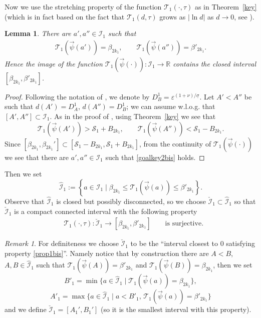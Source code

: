 \documentclass[10pt]{article}
\numberwithin{equation}{section}
\def\ep{\varepsilon}
\def\R{{\mathbb R}}
\def\SS{{\mathcal S}}
\def\TTT{\mathscr{T}}
\newtheorem{lemma}[theorem]{Lemma}
\theoremstyle{definition}
\theoremstyle{remark}
\newtheorem{remark}[theorem]{Remark}
\begin{document}
Now we use the stretching property of the function  $\TTT_1(\cdot, \tau)$  as in Theorem~\ref{key} (which is in fact
based on the fact that $\TTT_1(d, \tau)$ grows as  $|\ln d|$   as $d \to 0$, see \cite{CFPrestate}).

\begin{lemma}\label{key2bismod}
  There are $a',a'' \in   \mathcal{I}_1$ such that
 \begin{equation}\label{goalkey2bis}
   \begin{split}
    \TTT_1(\vec{\psi}(a')) =     \beta_{2k_1},  \qquad  \TTT_1(\vec{\psi}(a'')) =     \beta'_{2k_1}.
   \end{split}
 \end{equation}
 Hence the image of the function $\TTT_1(\vec{\psi}(\cdot)) :  \mathcal{I}_1 \to \R$
 contains the closed interval $[\beta_{2k_1} ,\beta'_{2k_1}]$.
\end{lemma}
\begin{proof}
Following the notation of \cite[Lemma 5.1]{CFPrestate}, we denote by  $D^1_B= \ep^{(1+\nu)/\underline{\sigma}}$. Let   $A'<A''$  be such that
$d(A')=D_A^1$, $d(A'')=D_B^1$; we can assume w.l.o.g. that $[A',A''] \subset \mathcal{I}_1$. As in the proof of \cite[Lemma 5.1]{CFPrestate},
using Theorem~\ref{key} we see that
$$\TTT_1 (\vec{\psi}(A'))> \SS_1+ B_{2k_1}, \qquad  \TTT_1 (\vec{\psi}(A''))< \SS_1- B_{2k_1}.$$
Since
$[\beta_{2k_1},\beta_{2k_1}']\subset[\SS_1-B_{2k_1},\SS_1+B_{2k_1}]$, from the continuity of $\TTT_1 (\vec{\psi}(\cdot))$   we see that there
are $a', a'' \in \mathcal{I}_1$ such that
\eqref{goalkey2bis} holds.
\end{proof}
Then we set
$$
\mathcal{\hat{I}}_1:=  \left\{ a \in \mathcal{I}_1 \mid \beta_{2k_1} \le \TTT_1(\vec{\psi}(a))  \le \beta'_{2k_1}   \right\}.$$
Observe that $\mathcal{\hat{I}}_1$ is closed but possibly disconnected, so we choose $\mathcal{\check{I}}_1\subset \mathcal{\hat{I}}_1$ so
that
$\mathcal{\check{I}}_1$ is a compact connected interval with the following property
 \begin{equation}\label{prop1bis}
     \begin{split}
 &   \TTT_1(\cdot,\tau):  \mathcal{\check{I}}_1  \to  [\beta_{2k_1}, \beta'_{2k_1}] \qquad \textrm{is surjective}.
                                 \end{split}
   \end{equation}



\begin{remark}\label{closest}
  For definiteness  we choose $\mathcal{\check{I}}_1$ to be   the ``interval closest to $0$ satisfying property
   \eqref{prop1bis}''.  Namely notice that by construction there are $A<B$, $A,B \in \mathcal{\hat{I}}_1$  such that $\TTT_1(\vec{\psi}(A))=\beta'_{2k_1}$ and
   $\TTT_1(\vec{\psi}(B))=\beta_{2k_1}$, then we set
$$B'_1= \min \{a \in  \mathcal{\hat{I}}_1 \mid  \TTT_1(\vec{\psi}(a))=\beta_{2k_1}   \}, $$
$$  A'_1= \max \{ a\in \mathcal{\hat{I}}_1 \mid a< B'_1, \,
\TTT_1(\vec{\psi}(a))=\beta'_{2k_1}  \}$$  and we define $\mathcal{\check{I}}_1=[A_1', B_1']$
(so it is the   smallest   interval with this property).
   \end{remark}
\end{document}

